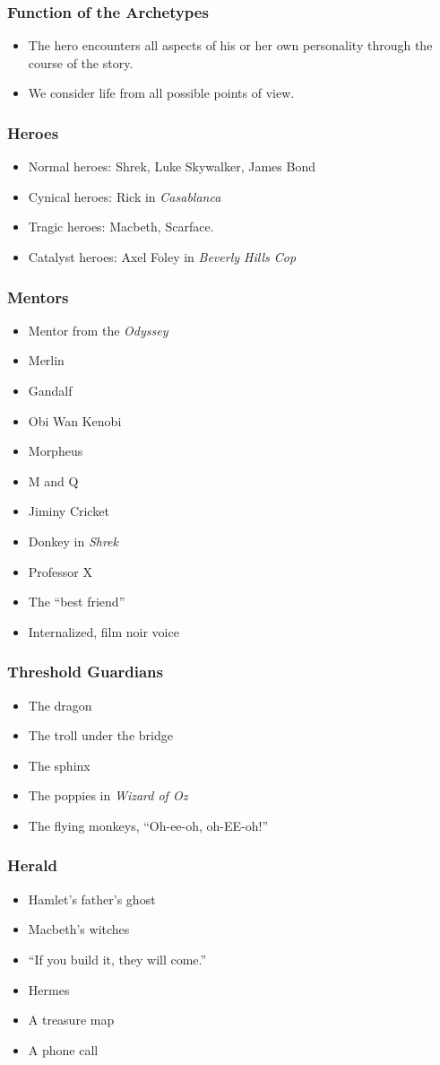 \documentclass{beamer}
\newcommand{\bi}{\begin{itemize}}
\newcommand{\ei}{\end{itemize}}
\begin{document}
\begin{frame}\frametitle{Function of the Archetypes}

\bi
\item
The hero encounters all aspects of his or her own personality
through the course of the story.
\item
We consider life from all possible points of view.
\ei

\end{frame}
\begin{frame}\frametitle{Heroes}
\bi
\item Normal heroes: Shrek, Luke Skywalker, James Bond
\item Cynical heroes: Rick in {\em Casablanca}
\item Tragic heroes: Macbeth, Scarface.
\item Catalyst heroes: Axel Foley in {\em Beverly Hills Cop}
\ei 

\end{frame}
\begin{frame}\frametitle{Mentors}
\bi
\item Mentor from the {\em Odyssey}
\item Merlin
\item Gandalf
\item Obi Wan Kenobi
\item Morpheus
\item M and Q
\item Jiminy Cricket
\item Donkey in {\em Shrek}
\item Professor X
\item The ``best friend''
\item Internalized, film noir voice
\ei

\end{frame}
\begin{frame}\frametitle{Threshold Guardians}
\bi
\item The dragon
\item The troll under the bridge
\item The sphinx
\item The poppies in {\em Wizard of Oz}
\item The flying monkeys, ``Oh-ee-oh, oh-EE-oh!''
\ei

\end{frame}
\begin{frame}\frametitle{Herald}
\bi
\item Hamlet's father's ghost
\item Macbeth's witches
\item ``If you build it, they will come.''
\item Hermes
\item A treasure map
\item A phone call
\ei

\end{frame}
\end{document}
